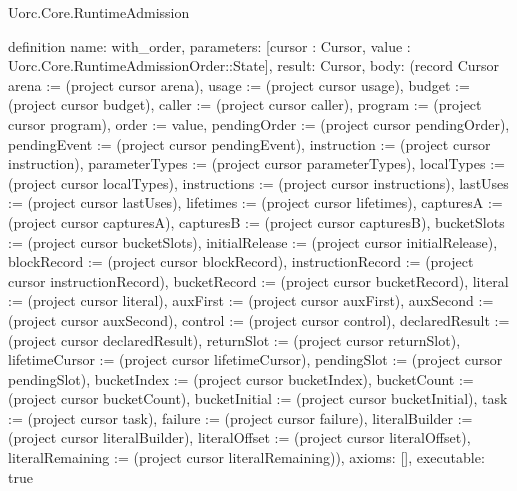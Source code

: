 \begin{lexlean}{Uorc.Core.RuntimeAdmission}
\begin{semanticmodule}
definition{
  name: with_order,
  parameters: [cursor : Cursor, value : Uorc.Core.RuntimeAdmissionOrder::State],
  result: Cursor,
  body: (record Cursor {arena := (project cursor arena), usage := (project cursor usage), budget := (project cursor budget), caller := (project cursor caller), program := (project cursor program), order := value, pendingOrder := (project cursor pendingOrder), pendingEvent := (project cursor pendingEvent), instruction := (project cursor instruction), parameterTypes := (project cursor parameterTypes), localTypes := (project cursor localTypes), instructions := (project cursor instructions), lastUses := (project cursor lastUses), lifetimes := (project cursor lifetimes), capturesA := (project cursor capturesA), capturesB := (project cursor capturesB), bucketSlots := (project cursor bucketSlots), initialRelease := (project cursor initialRelease), blockRecord := (project cursor blockRecord), instructionRecord := (project cursor instructionRecord), bucketRecord := (project cursor bucketRecord), literal := (project cursor literal), auxFirst := (project cursor auxFirst), auxSecond := (project cursor auxSecond), control := (project cursor control), declaredResult := (project cursor declaredResult), returnSlot := (project cursor returnSlot), lifetimeCursor := (project cursor lifetimeCursor), pendingSlot := (project cursor pendingSlot), bucketIndex := (project cursor bucketIndex), bucketCount := (project cursor bucketCount), bucketInitial := (project cursor bucketInitial), task := (project cursor task), failure := (project cursor failure), literalBuilder := (project cursor literalBuilder), literalOffset := (project cursor literalOffset), literalRemaining := (project cursor literalRemaining)}),
  axioms: [],
  executable: true
}


\end{semanticmodule}
\end{lexlean}
